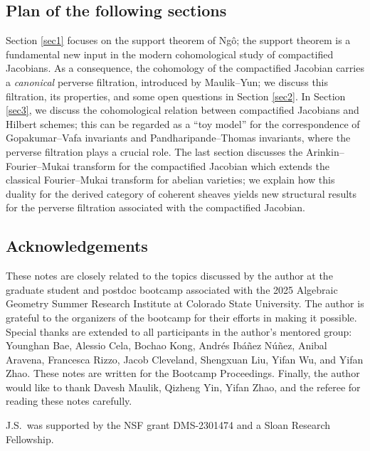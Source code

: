 \documentclass{pspum-l}
\theoremstyle{plain}
\theoremstyle{definition}
\theoremstyle{remark}
\begin{document}
\subsection*{Plan of the following sections}
 Section \ref{sec1} focuses on the support theorem of Ng\^o; the support theorem is a fundamental new input in the modern cohomological study of compactified Jacobians. As a consequence, the cohomology of the compactified Jacobian carries a \emph{canonical} perverse filtration, introduced by Maulik--Yun; we discuss this filtration, its properties, and some open questions in Section \ref{sec2}. In Section \ref{sec3}, we discuss the cohomological relation between compactified Jacobians and Hilbert schemes; this can be regarded as a ``toy model'' for the correspondence of Gopakumar--Vafa invariants and Pandharipande--Thomas invariants, where the perverse filtration plays a crucial role. The last section discusses the Arinkin--Fourier--Mukai transform for the compactified Jacobian which extends the classical Fourier--Mukai transform for abelian varieties; we explain how this duality for the derived category of coherent sheaves yields new structural results for the perverse filtration associated with the compactified Jacobian. 





\subsection*{Acknowledgements}

These notes are closely related to the topics discussed by the author at the graduate student and postdoc bootcamp associated with the 2025 Algebraic Geometry Summer Research Institute at Colorado State University. The author is grateful to the organizers of the bootcamp for their efforts in making it possible. Special thanks are extended to all participants in the author’s mentored group: Younghan Bae, Alessio Cela, Bochao Kong, Andrés Ibáñez Núñez, Anibal Aravena, Francesca Rizzo, Jacob Cleveland, Shengxuan Liu, Yifan Wu, and Yifan Zhao. These notes are written for the Bootcamp Proceedings. Finally, the author would like to thank Davesh Maulik, Qizheng Yin, Yifan Zhao, and the referee for reading these notes carefully.



J.S.~was supported by the NSF grant DMS-2301474 and a Sloan Research Fellowship.
\end{document}
